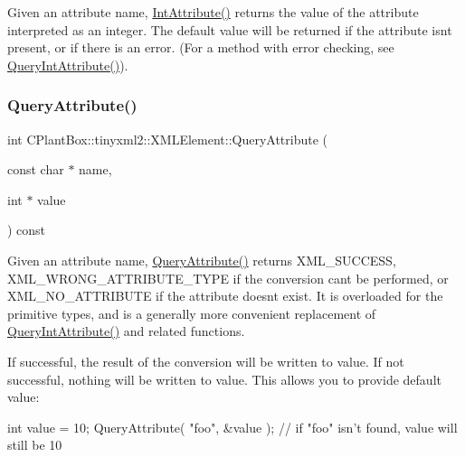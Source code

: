 Given an attribute name, \hyperlink{classCPlantBox_1_1tinyxml2_1_1XMLElement_ac0bb2fd733415649e95c36b08a7b700e}{Int\+Attribute()} returns the value of the attribute interpreted as an integer. The default value will be returned if the attribute isn\textquotesingle{}t present, or if there is an error. (For a method with error checking, see \hyperlink{classCPlantBox_1_1tinyxml2_1_1XMLElement_adb0a6e52cb23f9226fa31af9eaebfd72}{Query\+Int\+Attribute()}). \mbox{\label{classCPlantBox_1_1tinyxml2_1_1XMLElement_a48c0c945203b572ea786ce6d8b4d7b87}} 
\subsubsection{\texorpdfstring{Query\+Attribute()}{QueryAttribute()}}
{\footnotesize\ttfamily int C\+Plant\+Box\+::tinyxml2\+::\+X\+M\+L\+Element\+::\+Query\+Attribute (\begin{DoxyParamCaption}\item[{const char $\ast$}]{name,  }\item[{int $\ast$}]{value }\end{DoxyParamCaption}) const\hspace{0.3cm}{\ttfamily [inline]}}

Given an attribute name, \hyperlink{classCPlantBox_1_1tinyxml2_1_1XMLElement_a48c0c945203b572ea786ce6d8b4d7b87}{Query\+Attribute()} returns X\+M\+L\+\_\+\+S\+U\+C\+C\+E\+SS, X\+M\+L\+\_\+\+W\+R\+O\+N\+G\+\_\+\+A\+T\+T\+R\+I\+B\+U\+T\+E\+\_\+\+T\+Y\+PE if the conversion can\textquotesingle{}t be performed, or X\+M\+L\+\_\+\+N\+O\+\_\+\+A\+T\+T\+R\+I\+B\+U\+TE if the attribute doesn\textquotesingle{}t exist. It is overloaded for the primitive types, and is a generally more convenient replacement of \hyperlink{classCPlantBox_1_1tinyxml2_1_1XMLElement_adb0a6e52cb23f9226fa31af9eaebfd72}{Query\+Int\+Attribute()} and related functions.

If successful, the result of the conversion will be written to \textquotesingle{}value\textquotesingle{}. If not successful, nothing will be written to \textquotesingle{}value\textquotesingle{}. This allows you to provide default value\+:

\begin{DoxyVerb}int value = 10;
QueryAttribute( "foo", &value );        // if "foo" isn't found, value will still be 10
\end{DoxyVerb}
 \mbox{\label{classCPlantBox_1_1tinyxml2_1_1XMLElement_adb0a6e52cb23f9226fa31af9eaebfd72}} 

